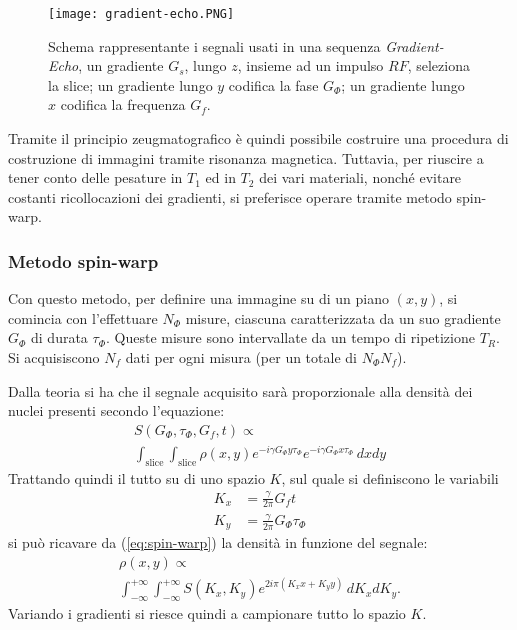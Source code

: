 \begin{figure}[ht]
\centering
\texttt{[image: gradient-echo.PNG]}
\caption{Schema rappresentante i segnali usati in una sequenza \textit{Gradient-Echo}, un gradiente $G_s$, lungo $z$, insieme ad un impulso $RF$, seleziona la slice; un gradiente lungo $y$ codifica la fase $G_\Phi$; un gradiente lungo $x$ codifica la frequenza $G_f$.}
\label{fig:GEcho}
\end{figure}

Tramite il principio zeugmatografico è quindi possibile costruire una procedura di costruzione di immagini tramite risonanza magnetica. 
Tuttavia, per riuscire a tener conto delle pesature in $T_1$ ed in $T_2$ dei vari materiali, nonché evitare costanti ricollocazioni dei gradienti, si preferisce operare tramite metodo spin-warp.

\subsubsection*{Metodo spin-warp}

Con questo metodo, per definire una immagine su di un piano $(x,y)$, si comincia con l'effettuare $N_{\Phi}$ misure, ciascuna caratterizzata da un suo gradiente $G_{\Phi}$ di durata $\tau_{\Phi}$. Queste misure sono intervallate da un tempo di ripetizione $T_R$. Si acquisiscono $N_f$ dati per ogni misura (per un totale di $N_{\Phi}N_f$).

Dalla teoria si ha che il segnale acquisito sarà proporzionale alla densità dei nuclei presenti secondo l'equazione:
\begin{multline}
	S(G_{\Phi}, \tau_{\Phi}, G_f, t) \propto\\ \int_{\text{slice}}\int_{\text{slice}} \rho(x,y) e^{-i\gamma G_\Phi y \tau_\Phi}e^{-i\gamma G_\Phi x \tau_\Phi} \, dxdy
	\label{eq:spin-warp}
\end{multline}
Trattando quindi il tutto su di uno spazio $K$, sul quale si definiscono le variabili
\begin{align}
	K_x &= \frac{\gamma}{2\pi}G_f t \\
	K_y &= \frac{\gamma}{2\pi}G_\Phi \tau_\Phi
\end{align}
si può ricavare da (\ref{eq:spin-warp}) la densità in funzione del segnale:
\begin{multline}
	\rho(x,y) \propto \\\int_{-\infty}^{+\infty}\int_{-\infty}^{+\infty} S(K_x,K_y) e^{2i\pi(K_x x +K_y y)}\, dK_x dK_y    .
\end{multline}
Variando i gradienti si riesce quindi a campionare tutto lo spazio $K$.

